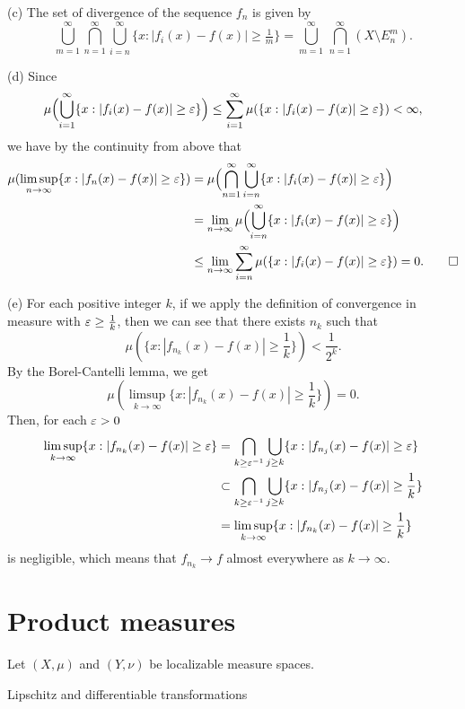 \documentclass{../../large}
\begin{document}
\begin{pf}
(c)
The set of divergence of the sequence $f_n$ is given by
\[\bigcup_{m=1}^\infty\bigcap_{n=1}^\infty\bigcup_{i=n}^\infty\{x:|f_i(x)-f(x)|\ge\tfrac1m\}=\bigcup_{m=1}^\infty\,\bigcap_{n=1}^\infty(X\setminus E_n^m).\]

(d)
Since
\[\mu\Bigl(\bigcup_{i=1}^\infty\{x:|f_i(x)-f(x)|\ge\varepsilon\}\Bigr)\le\sum_{i=1}^\infty\mu(\{x:|f_i(x)-f(x)|\ge\varepsilon\})<\infty,\]
we have by the continuity from above that
\begin{align*}
\mu(\limsup_{n\to\infty}\{x:|f_n(x)-f(x)|\ge\varepsilon\})
&=\mu\Bigl(\bigcap_{n=1}^\infty\bigcup_{i=n}^\infty\{x:|f_i(x)-f(x)|\ge\varepsilon\}\Bigr)\\
&=\lim_{n\to\infty}\mu\Bigl(\bigcup_{i=n}^\infty\{x:|f_i(x)-f(x)|\ge\varepsilon\}\Bigr)\\
&\le\lim_{n\to\infty}\sum_{i=n}^\infty\mu(\{x:|f_i(x)-f(x)|\ge\varepsilon\})
=0.\qedhere
\end{align*}


(e)
For each positive integer $k$, if we apply the definition of convergence in measure with $\varepsilon\ge\frac1k$, then we can see that there exists $n_k$ such that
\[\mu(\{x:|f_{n_k}(x)-f(x)|\ge\frac1k\})<\frac1{2^k}.\]
By the Borel-Cantelli lemma, we get
\[\mu(\limsup_{k\to\infty}\{x:|f_{n_k}(x)-f(x)|\ge\frac1k\})=0.\]
Then, for each $\varepsilon>0$
\begin{align*}
\limsup_{k\to\infty}\{x:|f_{n_k}(x)-f(x)|\ge\varepsilon\}
&=\bigcap_{k\ge\varepsilon^{-1}}\bigcup_{j\ge k}\{x:|f_{n_j}(x)-f(x)|\ge\varepsilon\}\\
&\subset\bigcap_{k\ge\varepsilon^{-1}}\bigcup_{j\ge k}\{x:|f_{n_j}(x)-f(x)|\ge\frac1k\}\\
&=\limsup_{k\to\infty}\{x:|f_{n_k}(x)-f(x)|\ge\frac1k\}
\end{align*}
is negligible, which means that $f_{n_k}\to f$ almost everywhere as $k\to\infty$.

\end{pf}







\section{Product measures}

\begin{prb}
Let $(X,\mu)$ and $(Y,\nu)$ be localizable measure spaces.
\end{prb}


Lipschitz and differentiable transformations
\end{document}
